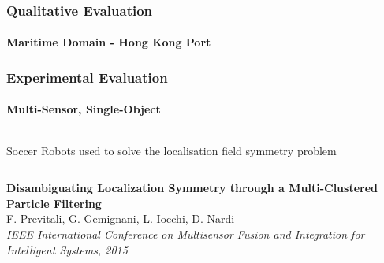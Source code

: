 \begin{frame}
	\frametitle{Qualitative Evaluation}
	\framesubtitle{Maritime Domain - Hong Kong Port}
	
	\begin{figure}[!h]
		\centering
	\end{figure}
\end{frame}

\begin{frame}
	\frametitle{Experimental Evaluation}
	\framesubtitle{Multi-Sensor, Single-Object}
	
	\large
	
	\vspace{-0.3cm}
	
	\begin{columns}[t]
		{
			
			\begin{block}{Soccer Robots}
				used to solve the localisation field symmetry problem
			\end{block}
			
		}
	\end{columns}
	
	\vspace{0.15cm}
	
	\begin{center}
	\end{center}
	
	\tiny
	
	\textbf{Disambiguating Localization Symmetry through a Multi-Clustered Particle Filtering} \\
	F. Previtali, G. Gemignani, L. Iocchi, D. Nardi \\
	\emph{IEEE International Conference on Multisensor Fusion and Integration for Intelligent Systems,
	2015} \\
\end{frame}

